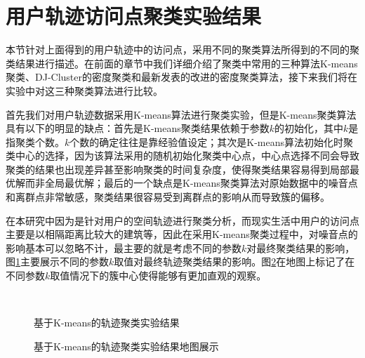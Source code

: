 \section{用户轨迹访问点聚类实验结果}
\label{traclustar}
本节针对上面得到的用户轨迹中的访问点，采用不同的聚类算法所得到的不同的聚类结果进行描述。在前面的章节中我们详细介绍了聚类中常用的三种算法K-means聚类、DJ-Cluster的密度聚类和最新发表的改进的密度聚类算法，接下来我们将在实验中对这三种聚类算法进行比较。
\par 首先我们对用户轨迹数据采用K-means算法进行聚类实验，但是K-means聚类算法具有以下的明显的缺点：首先是K-means聚类结果依赖于参数$k$的初始化，其中$k$是指聚类个数。$k$个数的确定往往是靠经验值设定；其次是K-means算法初始化时聚类中心的选择，因为该算法采用的随机初始化聚类中心点，中心点选择不同会导致聚类的结果也出现差异甚至影响聚类的时间复杂度，使得聚类结果容易得到局部最优解而非全局最优解；最后的一个缺点是K-means聚类算法对原始数据中的噪音点和离群点非常敏感，聚类结果很容易受到离群点的影响从而导致簇的偏移。
\par 在本研究中因为是针对用户的空间轨迹进行聚类分析，而现实生活中用户的访问点主要是以相隔距离比较大的建筑等，因此在采用K-means聚类过程中，对噪音点的影响基本可以忽略不计，最主要的就是考虑不同的参数$k$对最终聚类结果的影响，图\ref{fig:3_8_1}主要展示不同的参数$k$取值对最终轨迹聚类结果的影响。图\ref{fig:3_9_1}在地图上标记了在不同参数$k$取值情况下的簇中心使得能够有更加直观的观察。
\begin{figure}[htb]
  \centering%
  \\
  \caption{基于K-means的轨迹聚类实验结果}
  \label{fig:3_8_1}
\end{figure}
\begin{figure}[htb]
  \centering%
  \caption{基于K-means的轨迹聚类实验结果地图展示}
  \label{fig:3_9_1}
\end{figure}

